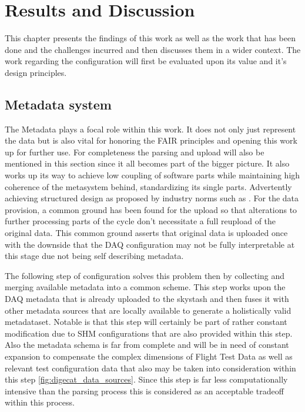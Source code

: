 \chapter{Results and Discussion}

This chapter presents the findings of this work as well as the work that has been done and the challenges incurred and then discusses them in a wider context. The work regarding the configuration will first be evaluated upon its value and it's design principles.








\section{Metadata system}

The Metadata plays a focal role within this work. It does not only just represent the data but is also vital for honoring the FAIR principles and opening this work up for further use. For completeness the parsing and upload will also be mentioned in this section since it all becomes part of the bigger picture. It also works up its way to achieve low coupling of software parts while maintaining high coherence of the metasystem behind, standardizing its single parts. Advertently achieving structured design as proposed by industry norms such as \textcite{stevens_structured_1974}.
For the data provision, a common ground has been found for the upload so that alterations to further processing parts of the cycle don't necessitate a full reupload of the original data. This common ground asserts that original data is uploaded once with the downside that the DAQ configuration may not be fully interpretable at this stage due not being self describing metadata.

The following step of configuration solves this problem then by collecting and merging available metadata into a common scheme. This step works upon the DAQ metadata that is already uploaded to the skystash and then fuses it with other metadata sources that are locally available to generate a holistically valid metadataset. Notable is that this step will certainly be part of rather constant modification due to SHM configurations that are also provided within this step. Also the metadata schema is far from complete and will be in need of constant expansion to compensate the complex dimensions of Flight Test Data as well as relevant test configuration data that also may be taken into consideration within this step \ref{fig:digecat_data_sources}. Since this step is far less computationally intensive than the parsing process this is considered as an acceptable tradeoff within this process.

